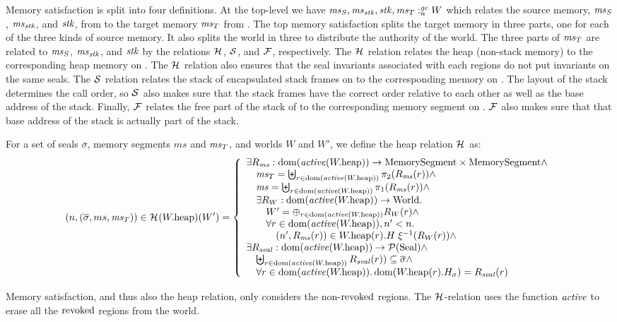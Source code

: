\begin{jversion}
Memory satisfaction is split into four definitions.
At the top-level we have $\memSat{\ms_S,\ms_\stk,\stk,\ms_T}{W}$ which relates the source memory, $\ms_S$, $\ms_\stk$, and $\stk$, from \srccm{} to the target memory $\ms_T$ from \trgcm{}.
The top memory satisfaction splits the target memory in three parts, one for each of the three kinds of source memory.
It also splits the world in three to distribute the authority of the world.
The three parts of $\ms_T$ are related to $\ms_S$, $\ms_\stk$, and $\stk$ by the relations $\lrheap$, $\lrstk[]$, and $\lrfree[]$, respectively. 
The $\lrheap$ relation relates the \srccm{} heap (non-stack memory) to the corresponding heap memory on \trgcm{}.
The $\lrheap$ relation also ensures that the seal invariants associated with each regions do not put invariants on the same seals.
The $\lrstk[]$ relation relates the stack of encapsulated stack frames on \srccm{} to the corresponding memory on \trgcm{}.
The layout of the stack determines the call order, so $\lrstk[]$ also makes sure that the stack frames have the correct order relative to each other as well as the base address of the stack.
Finally, $\lrfree[]$ relates the free part of the stack of \srccm{} to the corresponding memory segment on \trgcm{}.
$\lrfree[]$ also makes sure that that base address of the stack is actually part of the stack.
\begin{definition}
\label{def:heap-rel}
For a set of seals $\overline{\sigma}$, memory segments $ms$ and $\ms_T$, and worlds $W$ and $W'$, we define the heap relation $\lrheap$ as:
\[
  \npair{(\overline{\sigma},ms,\ms_T)} \in \lrheap(\pwheap)(W') = 
  \left\{
    \begin{array}{l}
      \exists R_\ms : \dom(\activeReg{\pwheap}) \fun \MemSeg \times \MemSeg \wedge \\
      \quad \ms_T = \biguplus_{r \in \dom(\activeReg{\pwheap})} \pi_2(R_\ms(r)) \wedge \\
      \quad \ms = \biguplus_{r \in \dom(\activeReg{\pwheap})} \pi_1(R_\ms(r)) \wedge \\
      \quad \exists R_W : \dom(\activeReg{\pwheap}) \fun \World\ldotp\\
      \qquad W' = \oplus_{r \in \dom(\activeReg{\pwheap})} R_W(r) \wedge\\
      \qquad \forall r \in \dom(\activeReg{\pwheap}), n' < n \ldotp \\
      \qquad \quad \npair[n']{R_\ms(r)} \in  \pwheap(r).H \; \xi^{-1}(R_W(r)) \wedge\\
      \exists R_\var{seal} : \dom(\activeReg{\pwheap}) \fun \powerset{\Seal} \wedge\\
      \quad \biguplus_{r \in \dom(\activeReg{\pwheap})} R_\var{seal}(r)) \subseteq \overline{\sigma} \wedge\\
      \quad \forall r \in \dom(\activeReg{\pwheap})\ldotp \dom(\pwheap(r).H_\sigma) = R_\var{seal}(r)
    \end{array}
  \right.
\]
\end{definition}
Memory satisfaction, and thus also the heap relation, only considers the non-$\revoked$ regions.
The $\lrheap$-relation uses the function $\activeReg{}$ to erase all the $\revoked$ regions from the world.


\end{jversion}
